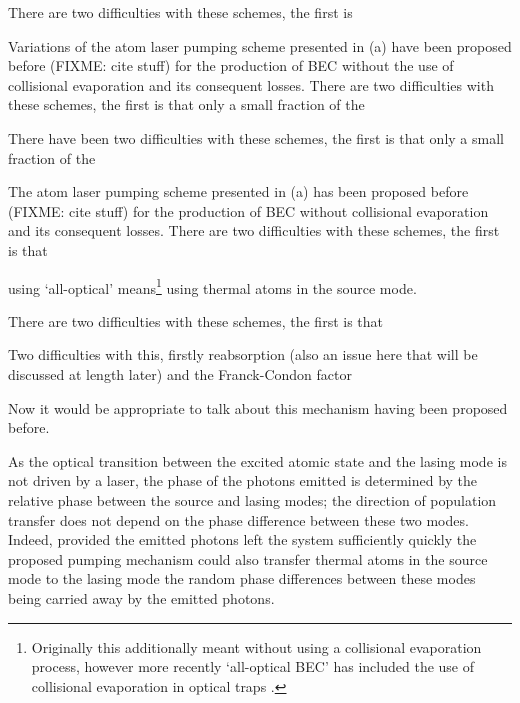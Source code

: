 There are two difficulties with these schemes, the first is 





Variations of the atom laser pumping scheme presented in (a) have been proposed before (FIXME: cite stuff) for the production of BEC without the use of collisional evaporation and its consequent losses.  There are two difficulties with these schemes, the first is that only a small fraction of the 





There have been two difficulties with these schemes, the first is that only a small fraction of the 


The atom laser pumping scheme presented in (a) has been proposed before (FIXME: cite stuff) for the production of BEC without collisional evaporation and its consequent losses.  There are two difficulties with these schemes, the first is that 


using `all-optical' means\footnote{Originally this additionally meant without using a collisional evaporation process, however more recently `all-optical BEC' has included the use of collisional evaporation in optical traps \citep{Barrett:2001}.} using thermal atoms in the source mode.  


There are two difficulties with these schemes, the first is that 


Two difficulties with this, firstly reabsorption (also an issue here that will be discussed at length later) and the Franck-Condon factor




Now it would be appropriate to talk about this mechanism having been proposed before.




As the optical transition between the excited atomic state and the lasing mode is not driven by a laser, the phase of the photons emitted is determined by the relative phase between the source and lasing modes; the direction of population transfer does not depend on the phase difference between these two modes.  Indeed, provided the emitted photons left the system sufficiently quickly the proposed pumping mechanism could also transfer thermal atoms in the source mode to the lasing mode the random phase differences between these modes being carried away by the emitted photons.



